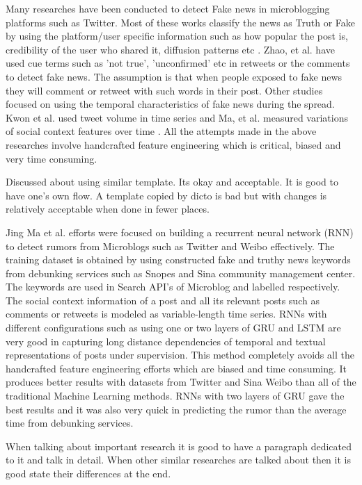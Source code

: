 \documentclass[a4paper, 11pt]{article}
\begin{document}
Many researches have been conducted to detect Fake news in microblogging platforms such as Twitter. Most of these works classify the news as Truth or Fake by using the platform/user specific information such as how popular the post is, credibility of the user who shared it, diffusion patterns etc \cite{Liu2015} \cite{Ma2015}. Zhao, et al. have used cue terms such as 'not true', 'unconfirmed' etc in retweets or the comments to detect fake news. The assumption is that when people exposed to fake news they will comment or retweet with such words in their post\cite{Zhao2015}. Other studies focused on using the temporal characteristics of fake news during the spread. Kwon et al. used tweet volume in time series and Ma, et al. measured variations of social context features over time\cite{Kwon2013} \cite{Ma2015}. All the attempts made in the above researches involve handcrafted feature engineering which is critical, biased and very time consuming.

\color{red}
Discussed about using similar template. Its okay and acceptable. It is good to have one's own flow. A template copied by dicto is bad but with changes is relatively acceptable when done in fewer places. 
\color{black}

Jing Ma et al. efforts were focused on building a recurrent neural network (RNN) to detect rumors from Microblogs such as Twitter and Weibo effectively. The training dataset is obtained by using constructed fake and truthy news keywords from debunking services such as Snopes and Sina community management center. The keywords are used in Search API's of Microblog and labelled respectively. The social context information of a post and all its relevant posts such as comments or retweets is modeled as variable-length time series. RNNs with different configurations such as using one or two layers of GRU and LSTM are very good in capturing long distance dependencies of temporal and textual representations of posts under supervision. This method completely avoids all the handcrafted feature engineering efforts which are biased and time consuming. It produces better results with datasets from Twitter and Sina Weibo than all of the traditional Machine Learning methods. RNNs with two layers of GRU gave the best results and it was also very quick in predicting the rumor than the average time from debunking services\cite{Ma}.

\color{red}
When talking about important research it is good to have a paragraph dedicated to it and talk in detail. When other similar researches are talked about then it is good state their differences at the end.
\color{black}
\end{document}

